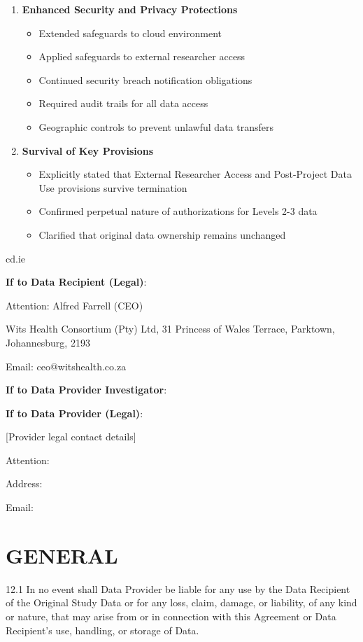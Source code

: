 {\begin{enumerate}
\begin{enumerate}
\item \textbf{Enhanced Security and Privacy Protections}
   \begin{itemize}
   \item Extended safeguards to cloud environment
   \item Applied safeguards to external researcher access
   \item Continued security breach notification obligations
   \item Required audit trails for all data access
   \item Geographic controls to prevent unlawful data transfers
   \end{itemize}

\item \textbf{Survival of Key Provisions}
   \begin{itemize}
   \item Explicitly stated that External Researcher Access and Post-Project Data Use provisions survive termination
   \item Confirmed perpetual nature of authorizations for Levels 2-3 data
   \item Clarified that original data ownership remains unchanged
   \end{itemize}
\end{enumerate}

cd.ie

\textbf{If to Data Recipient (Legal)}:

Attention: Alfred Farrell (CEO)

Wits Health Consortium (Pty) Ltd, 31 Princess of Wales Terrace, Parktown, Johannesburg, 2193

Email: ceo@witshealth.co.za

\textbf{If to Data Provider Investigator}:

\textbf{If to Data Provider (Legal)}:

[Provider legal contact details]

Attention:

Address:

Email:

\section{GENERAL}

12.1 In no event shall Data Provider be liable for any use by the Data Recipient of the Original Study Data or for any loss, claim, damage, or liability, of any kind or nature, that may arise from or in connection with this Agreement or Data Recipient's use, handling, or storage of Data.


\end{enumerate}}
